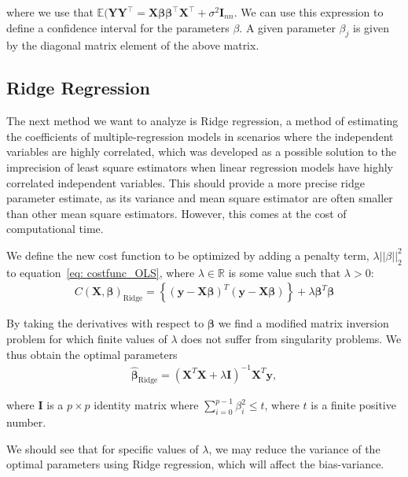 \documentclass[reprint,english,notitlepage]{revtex4-1}  %
\begin{document}
where we use that $\mathbb{E}(\mathbf{YY}^{\top} = \mathbf{X}\boldsymbol{\beta\beta}^{\top}\mathbf{X}^{\top} + \sigma^2\mathbf{I}_{nn}$. We can use this expression to define a confidence interval for the parameters $\beta$. A given parameter $\beta_j$ is given by the diagonal matrix element of the above matrix. 




\subsection*{Ridge Regression} 
The next method we want to analyze is Ridge regression, a method of estimating the coefficients of multiple-regression models in scenarios where the independent variables are highly correlated, which was developed as a possible solution to the imprecision of least square estimators when linear regression models have highly correlated independent variables. This should provide a more precise ridge parameter estimate, as its variance and mean square estimator are often smaller than other mean square estimators. However, this comes at the cost of computational time. 

We define the new cost function to be optimized by adding a penalty term, $\lambda||\beta||_2^2$ to equation~\ref{eq: costfunc_OLS}, where $\lambda\in\mathbb{R}$ is some value such that $\lambda > 0$: 
\begin{align}\label{eq: costfunc_ridge}
    C(\mathbf{X},\boldsymbol{\beta})_\text{Ridge} = \left\{ (\boldsymbol{y} - \mathbf{X}\boldsymbol{\beta})^T (\boldsymbol{y} - \mathbf{X}\boldsymbol{\beta}) \right\} + \lambda\boldsymbol{\beta}^T\boldsymbol{\beta}
\end{align}

By taking the derivatives with respect to $\boldsymbol{\beta}$ we find a modified matrix inversion problem for which finite values of $\lambda$ does not suffer from singularity problems. 
We thus obtain the optimal parameters 
\begin{align}\label{eq: optimal_ridge
}
    \boldsymbol{\hat{\beta}}_\text{Ridge} = {(\mathbf{X}^T\mathbf{X} + \lambda\mathbf{I})}^{-1} \mathbf{X}^T\boldsymbol{y}, 
\end{align}

where $\mathbf{I}$ is a $p\times p$ identity matrix where $\sum_{i=0}^{p-1}\beta_i^2\leq t$, where $t$ is a finite positive number. 

We should see that for specific values of $\lambda$, we may reduce the variance of the optimal parameters using Ridge regression, which will affect the bias-variance. 
\end{document}
